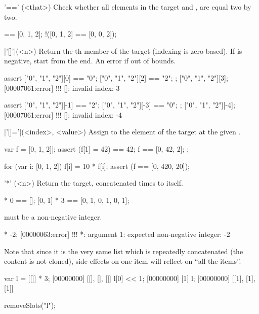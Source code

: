 \begin{urbiscriptapi}
\item['=='](<that>)%
Check whether all elements in the target and , are
equal two by two.

\begin{urbiassert}
[0, 1, 2] == [0, 1, 2];
!([0, 1, 2] == [0, 0, 2]);
\end{urbiassert}

\item|'[]'|(<n>)%
  Return the th member of the target (indexing is
  zero-based). If  is negative, start from the end.  An error
  if out of bounds.

\begin{urbiscript}
assert
{
  ["0", "1", "2"][0] == "0";
  ["0", "1", "2"][2] == "2";
};
["0", "1", "2"][3];
[00007061:error] !!! []: invalid index: 3

assert
{
  ["0", "1", "2"][-1] == "2";
  ["0", "1", "2"][-3] == "0";
};
["0", "1", "2"][-4];
[00007061:error] !!! []: invalid index: -4
\end{urbiscript}

\item|'[]='|(<index>, <value>)%
  Assign  to the element of the target at the given
  .

\begin{urbiscript}
var f = [0, 1, 2]|;
assert
{
  (f[1] = 42) == 42;
  f == [0, 42, 2];
};

for (var i: [0, 1, 2])
  f[i] = 10 * f[i];
assert (f == [0, 420, 20]);
\end{urbiscript}

\item['*'](<n>)%
  Return the target, concatenated  times to itself.
\begin{urbiassert}
[0, 1] * 0 == [];
[0, 1] * 3 == [0, 1, 0, 1, 0, 1];
\end{urbiassert}

   must be a non-negative integer.

\begin{urbiscript}
[0, 1] * -2;
[00000063:error] !!! *: argument 1: expected non-negative integer: -2
\end{urbiscript}


  Note that since it is the very same list which is repeatedly
  concatenated (the content is not cloned), side-effects on one item
  will reflect on ``all the items''.

\begin{urbiscript}
var l = [[]] * 3;
[00000000] [[], [], []]
l[0] << 1;
[00000000] [1]
l;
[00000000] [[1], [1], [1]]
\end{urbiscript}
\begin{urbicomment}
removeSlots("l");
\end{urbicomment}



\end{urbiscriptapi}
